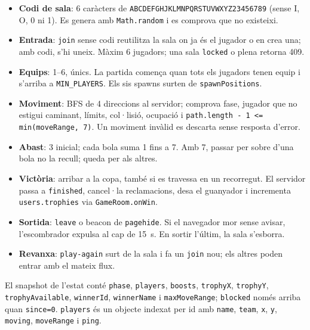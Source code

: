 \documentclass[10pt,a4paper]{article}
\begin{document}
\begin{itemize}[nosep]
  \item \textbf{Codi de sala}: 6 caràcters de
        \texttt{ABCDEFGHJKLMNPQRSTUVWXYZ23456789} (sense I, O, 0 ni 1). Es genera amb
        \texttt{Math.random} i es comprova que no existeixi.
  \item \textbf{Entrada}: \texttt{join} sense codi reutilitza la sala on ja és el
        jugador o en crea una; amb codi, s'hi uneix. Màxim 6 jugadors; una sala
        \texttt{locked} o plena retorna 409.
  \item \textbf{Equips}: 1--6, únics. La partida comença quan tots els jugadors tenen
        equip i s'arriba a \texttt{MIN\_PLAYERS}. Els sis spawns surten de
        \texttt{spawnPositions}.
  \item \textbf{Moviment}: BFS de 4 direccions al servidor; comprova fase, jugador que
        no estigui caminant, límits, col·lisió, ocupació i
        \texttt{path.length - 1 <= min(moveRange, 7)}. Un moviment invàlid es descarta
        sense resposta d'error.
  \item \textbf{Abast}: 3 inicial; cada bola suma 1 fins a 7. Amb 7, passar per sobre
        d'una bola no la recull; queda per als altres.
  \item \textbf{Victòria}: arribar a la copa, també si es travessa en un recorregut.
        El servidor passa a \texttt{finished}, cancel·la reclamacions, desa el
        guanyador i incrementa \texttt{users.trophies} via \texttt{GameRoom.onWin}.
  \item \textbf{Sortida}: \texttt{leave} o beacon de \texttt{pagehide}. Si el navegador
        mor sense avisar, l'escombrador expulsa al cap de 15~s. En sortir l'últim, la
        sala s'esborra.
  \item \textbf{Revanxa}: \texttt{play-again} surt de la sala i fa un \texttt{join}
        nou; els altres poden entrar amb el mateix flux.
\end{itemize}

El snapshot de l'estat conté \texttt{phase}, \texttt{players}, \texttt{boosts},
\texttt{trophyX}, \texttt{trophyY}, \texttt{trophyAvailable}, \texttt{winnerId},
\texttt{winnerName} i \texttt{maxMoveRange}; \texttt{blocked} només arriba quan
\texttt{since=0}. \texttt{players} és un objecte indexat per
id amb \texttt{name}, \texttt{team}, \texttt{x}, \texttt{y}, \texttt{moving},
\texttt{moveRange} i \texttt{ping}.

\end{document}
